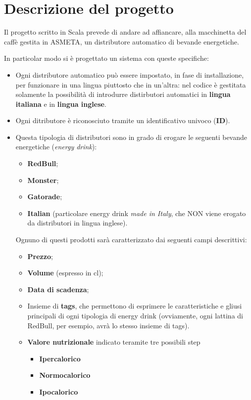 \section{Descrizione del progetto}
Il progetto scritto in Scala prevede di andare ad affiancare, alla macchinetta del caffè gestita in ASMETA, un distributore automatico di bevande energetiche.

In particolar modo si è progettato un sistema con queste specifiche:
\begin{itemize}
	\item Ogni distributore automatico può essere impostato, in fase di installazione, per funzionare in una lingua piuttosto che in un'altra: nel codice è gestitata solamente la possibilità di introdurre distirbutori automatici in \textbf{lingua italiana} e in \textbf{lingua inglese}.
	\item Ogni ditributore è riconosciuto tramite un identificativo univoco (\textbf{ID}).
	\item Questa tipologia di distributori sono in grado di erogare le seguenti bevande energetiche (\textit{energy drink}):
	\begin{itemize}
		\item \textbf{RedBull};
		\item \textbf{Monster};
		\item \textbf{Gatorade};
		\item \textbf{Italian} (particolare energy drink \textit{made in Italy}, che NON viene erogato da distributori in lingua inglese).
	\end{itemize}
	Ognuno di questi prodotti sarà caratterizzato dai seguenti campi descrittivi:
	\begin{itemize}
		\item \textbf{Prezzo};
		\item \textbf{Volume} (espresso in cl);
		\item\textbf{Data di scadenza};
		\item Insieme di \textbf{tags}, che permettono di esprimere le caratteristiche e gliusi principali di ogni tipologia di energy drink (ovviamente, ogni lattina di RedBull, per esempio, avrà lo stesso insieme di tags).
		\item \textbf{Valore nutrizionale} indicato teramite tre possibili step
		\begin{itemize}
			\item \textbf{Ipercalorico}
			\item \textbf{Normocalorico}
			\item \textbf{Ipocalorico}
		\end{itemize}
	\end{itemize}
\end{itemize}

